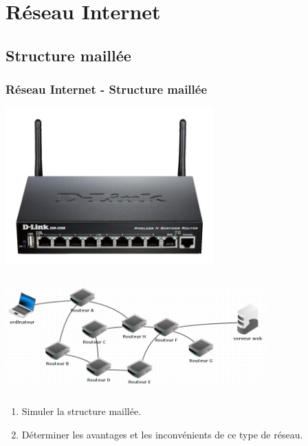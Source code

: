 \documentclass[svgnames,11pt]{beamer}
\begin{document}
\section{Réseau Internet}
\subsection{Structure maillée}
\begin{frame}
    \frametitle{Réseau Internet - Structure maillée}

    \begin{center}
    \centering
    \includegraphics[width=8cm]{ressources/routeur.png}
    \label{IMG}
    \end{center}

\end{frame}
\begin{frame}
    \frametitle{}

    \begin{center}
        \centering
        \includegraphics[width=10cm]{ressources/maille.png}
        \label{IMG}
        \end{center}

\end{frame}
\begin{frame}
    \frametitle{}

    \begin{activite}
    \begin{enumerate}
        \item Simuler la structure maillée.
        \item Déterminer les avantages et les inconvénients de ce type de réseau.
    \end{enumerate}
    \end{activite}

\end{frame}
\end{document}
